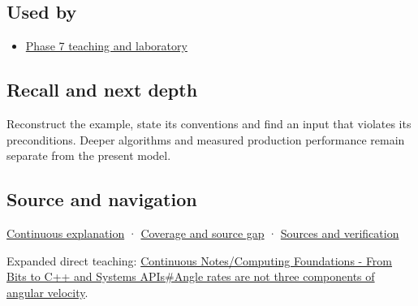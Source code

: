 \subsection{Used by}\label{appendix-5f723fbd0593-used-by}

\hypertarget{appendix-5f723fbd0593-used-by}{}

\begin{itemize}
\tightlist
\item
  \hyperref[01-foundations-i-ch018-keep-the-promises-visible-while-moving-between-representations]{Phase 7 teaching and laboratory}
\end{itemize}

\subsection{Recall and next depth}\label{appendix-5f723fbd0593-recall-and-next-depth}

\hypertarget{appendix-5f723fbd0593-recall-and-next-depth}{}

Reconstruct the example, state its conventions and find an input that violates its preconditions. Deeper algorithms and measured production performance remain separate from the present model.

\subsection{Source and navigation}\label{appendix-5f723fbd0593-source-and-navigation}

\hypertarget{appendix-5f723fbd0593-source-and-navigation}{}

\hyperref[01-foundations-i-ch018-keep-the-promises-visible-while-moving-between-representations]{Continuous explanation} · \hyperref[appendix-fd090d982a15-phase-7---parts-601-700]{Coverage and source gap} · \hyperref[appendix-a103e7846d21-phase-7---source-analysis-and-verification]{Sources and verification}

Expanded direct teaching: \hyperref[01-foundations-i-ch019-angle-rates-are-not-three-components-of-angular-velocity]{Continuous Notes/Computing Foundations - From Bits to C++ and Systems APIs\#Angle rates are not three components of angular velocity}.
